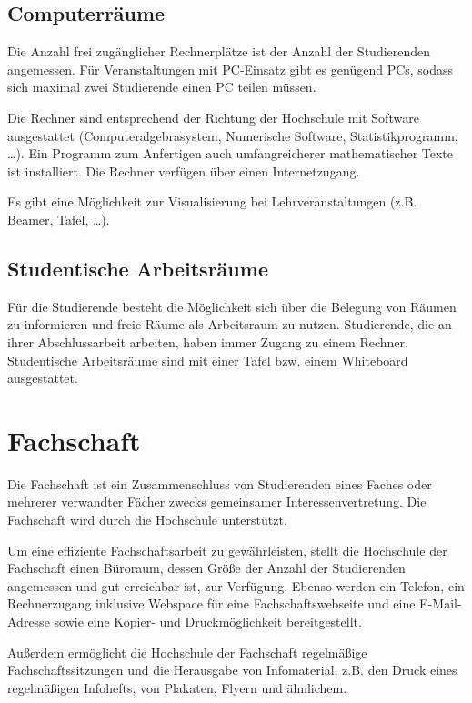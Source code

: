 \subsection{Computerräume}

Die Anzahl frei zugänglicher Rechnerplätze ist der Anzahl der Studierenden angemessen. Für Veranstaltungen mit PC-Einsatz gibt es genügend PCs, sodass sich maximal zwei Studierende einen PC teilen müssen.

Die Rechner sind entsprechend der Richtung der Hochschule mit Software ausgestattet (Computeralgebrasystem, Numerische Software, Statistikprogramm, \dots). Ein Programm zum Anfertigen auch umfangreicherer mathematischer Texte ist installiert. Die Rechner verfügen über einen Internetzugang.

Es gibt eine Möglichkeit zur Visualisierung bei Lehrveranstaltungen (z.B. Beamer, Tafel, \dots).

\subsection{Studentische Arbeitsräume}

Für die Studierende besteht die Möglichkeit sich über die Belegung von Räumen zu informieren und freie Räume als Arbeitsraum zu nutzen. Studierende, die an ihrer Abschlussarbeit arbeiten, haben immer Zugang zu einem Rechner. Studentische Arbeitsräume sind mit einer Tafel bzw. einem Whiteboard ausgestattet.

\section{Fachschaft}

Die Fachschaft ist ein Zusammenschluss von Studierenden eines Faches oder mehrerer verwandter Fächer zwecks gemeinsamer Interessenvertretung. Die Fachschaft wird durch die Hochschule unterstützt.

Um eine effiziente Fachschaftsarbeit zu gewährleisten, stellt die Hochschule der Fachschaft einen Büroraum, dessen Größe der Anzahl der Studierenden angemessen und gut erreichbar ist, zur Verfügung. Ebenso werden ein Telefon, ein Rechnerzugang inklusive Webspace für eine Fachschaftswebseite und eine E-Mail-Adresse sowie eine Kopier- und Druckmöglichkeit bereitgestellt.

Außerdem ermöglicht die Hochschule der Fachschaft regelmäßige Fachschaftssitzungen und die Herausgabe von Infomaterial, z.B. den Druck eines regelmäßigen Infohefts, von Plakaten, Flyern und ähnlichem.

